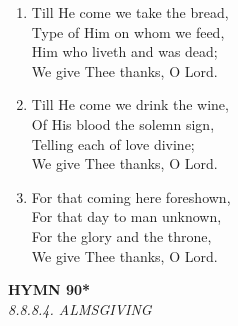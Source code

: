 \begin{enumerate}
    \item Till He come we take the bread, \\
        Type of Him on whom we feed, \\
        Him who liveth and was dead; \\
        We give Thee thanks, O Lord.

    \item Till He come we drink the wine, \\
        Of His blood the solemn sign, \\
        Telling each of love divine; \\
        We give Thee thanks, O Lord.

    \item For that coming here foreshown, \\
        For that day to man unknown, \\
        For the glory and the throne, \\
        We give Thee thanks, O Lord.

\end{enumerate}

\newpage
\begin{center}
    {\Large \textbf{HYMN 90*\textdagger{}}}
    \\
    \textit{8.8.8.4. ALMSGIVING}
\end{center}
\vspace{1em}

